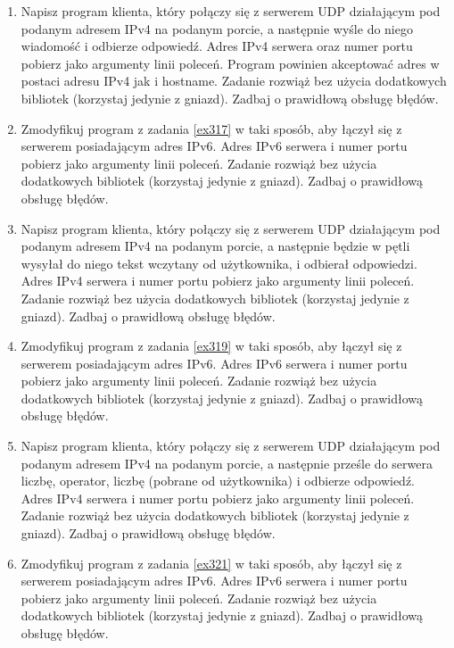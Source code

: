 \documentclass{article}
\begin{document}
\begin{enumerate}[label=\textbf{3.\arabic*}, resume]\setlength{\itemsep}{1em}

\item \label{ex317}  Napisz program klienta, który połączy się z serwerem UDP działającym pod podanym adresem IPv4 na podanym porcie, a następnie wyśle do niego wiadomość i odbierze odpowiedź. Adres IPv4 serwera oraz numer portu pobierz jako argumenty linii poleceń. Program powinien akceptować adres w postaci adresu IPv4 jak i hostname.  Zadanie rozwiąż bez użycia dodatkowych bibliotek (korzystaj jedynie z gniazd). Zadbaj o prawidłową obsługę błędów.  

\item  Zmodyfikuj program z zadania \ref{ex317} w taki sposób,  aby łączył się z serwerem posiadającym adres IPv6.  Adres IPv6 serwera i numer portu pobierz jako argumenty linii poleceń. Zadanie rozwiąż bez użycia dodatkowych bibliotek (korzystaj jedynie z gniazd). Zadbaj o prawidłową obsługę błędów. 

\item \label{ex319} Napisz program klienta, który połączy się z serwerem UDP działającym pod podanym adresem IPv4 na podanym porcie,  a następnie będzie w pętli wysyłał do niego tekst wczytany od użytkownika, i odbierał odpowiedzi.    Adres IPv4 serwera i numer portu pobierz jako argumenty linii poleceń. Zadanie rozwiąż bez użycia dodatkowych bibliotek (korzystaj jedynie z gniazd). Zadbaj o prawidłową obsługę błędów. 

\item  Zmodyfikuj program z zadania \ref{ex319} w taki sposób,  aby łączył się z serwerem posiadającym adres IPv6. Adres IPv6 serwera i numer portu pobierz jako argumenty linii poleceń. Zadanie rozwiąż bez użycia dodatkowych bibliotek (korzystaj jedynie z gniazd). Zadbaj o prawidłową obsługę błędów. 

\item \label{ex321} Napisz program klienta, który połączy się z serwerem UDP działającym pod podanym adresem IPv4 na podanym porcie, a następnie prześle do serwera liczbę, operator, liczbę (pobrane od użytkownika) i odbierze odpowiedź. Adres IPv4 serwera i numer portu pobierz jako argumenty linii poleceń.  Zadanie rozwiąż bez użycia dodatkowych bibliotek (korzystaj jedynie z gniazd). Zadbaj o prawidłową obsługę błędów. 

\item  Zmodyfikuj program z zadania \ref{ex321} w taki sposób,  aby łączył się z serwerem posiadającym adres IPv6. Adres IPv6 serwera i numer portu pobierz jako argumenty linii poleceń. Zadanie rozwiąż bez użycia dodatkowych bibliotek (korzystaj jedynie z gniazd). Zadbaj o prawidłową obsługę błędów. 


\end{enumerate}
\end{document}
